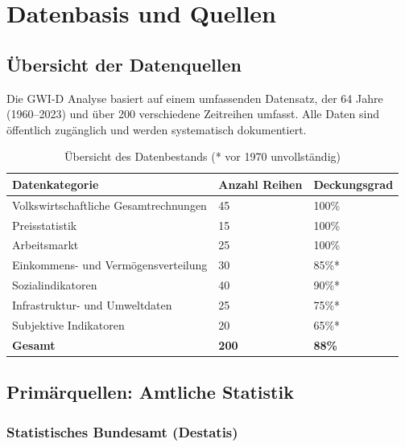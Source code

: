 \chapter{Datenbasis und Quellen}

\section{Übersicht der Datenquellen}

Die GWI-D Analyse basiert auf einem umfassenden Datensatz, der 64 Jahre (1960--2023) und über 200 verschiedene Zeitreihen umfasst. Alle Daten sind öffentlich zugänglich und werden systematisch dokumentiert.

\begin{table}[ht]
\centering
\begin{tabular}{lll}
\toprule
\textbf{Datenkategorie} & \textbf{Anzahl Reihen} & \textbf{Deckungsgrad} \\
\midrule
Volkswirtschaftliche Gesamtrechnungen & 45 & 100\% \\
Preisstatistik & 15 & 100\% \\
Arbeitsmarkt & 25 & 100\% \\
Einkommens- und Vermögensverteilung & 30 & 85\%* \\
Sozialindikatoren & 40 & 90\%* \\
Infrastruktur- und Umweltdaten & 25 & 75\%* \\
Subjektive Indikatoren & 20 & 65\%* \\
\hline
\textbf{Gesamt} & \textbf{200} & \textbf{88\%} \\
\bottomrule
\end{tabular}
\caption{Übersicht des Datenbestands (* vor 1970 unvollständig)}
\label{tab:datenbestand}
\end{table}

\section{Primärquellen: Amtliche Statistik}

\subsection{Statistisches Bundesamt (Destatis)}

